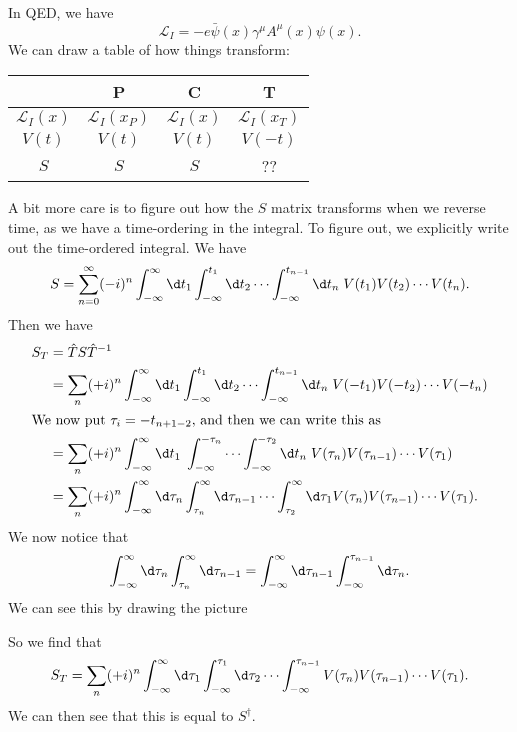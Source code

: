 \documentclass[a4paper]{article}
\begin{document}
\begin{eg}
  In QED, we have
  \[
    \mathcal{L}_I = - e \bar\psi (x) \gamma^\mu A^\mu (x) \psi(x).
  \]
  We can draw a table of how things transform:
  \begin{center}
    \begin{tabular}{cccc}
      \toprule
      & P & C & T\\
      \midrule
      $\mathcal{L}_I(x)$ & $\mathcal{L}_I(x_P)$ & $\mathcal{L}_I(x)$ & $\mathcal{L}_I(x_T)$\\
      $V(t)$ & $V(t)$ & $ V(t)$ & $V(-t)$ \\
      $S$ & $S$ & $S$ & ??\\
      \bottomrule
    \end{tabular}
  \end{center}
  A bit more care is to figure out how the $S$ matrix transforms when we reverse time, as we have a time-ordering in the integral. To figure out, we explicitly write out the time-ordered integral. We have
  \[
    S = \sum_{n = 0}^\infty (-i)^n \int_{-\infty}^\infty \d t_1 \int_{-\infty}^{t_1} \d t_2 \cdots \int_{-\infty}^{t_{n - 1}} \d t_n\; V(t_1) V(t_2) \cdots V(t_n).
  \]
  Then we have
  \begin{align*}
    S_T &= \hat{T} S\hat{T}^{-1} \\
    &= \sum_n (+i)^n \int_{-\infty}^\infty \d t_1 \int_{-\infty}^{t_1} \d t_2 \cdots \int_{-\infty}^{t_{n - 1}} \d t_n\; V(-t_1) V(-t_2) \cdots V(-t_n)\\
    \intertext{We now put $\tau_i = -t_{n + 1 - 2}$, and then we can write this as}
    &= \sum_n (+i)^n \int_{-\infty}^\infty \d t_1 \; \int_{-\infty}^{-\tau_n} \cdots \int_{-\infty}^{-\tau_2} \d t_n\; V(\tau_n) V(\tau_{n - 1}) \cdots V(\tau_1)\\
    &= \sum_n (+i)^n \int_{-\infty}^\infty \d \tau_n \int_{\tau_n}^\infty \d \tau_{n - 1} \cdots \int_{\tau_2}^\infty \d \tau_1 V(\tau_n) V(\tau_{n - 1}) \cdots V(\tau_1).
  \end{align*}
  We now notice that
  \[
    \int_{-\infty}^\infty \d \tau_n \int_{\tau_n}^\infty \d \tau_{n - 1} = \int_{-\infty}^\infty \d \tau_{n - 1} \int_{-\infty}^{\tau_{n - 1}} \d \tau_n.
  \]
  We can see this by drawing the picture
  \begin{center}
  \end{center}
  So we find that
  \[
    S_T = \sum_n (+i)^n \int_{-\infty}^\infty \d \tau_1 \int_{-\infty}^{\tau_1} \d \tau_2 \cdots \int_{-\infty}^{\tau_{n - 1}} V(\tau_n) V(\tau_{n - 1}) \cdots V(\tau_1).
  \]
  We can then see that this is equal to $S^\dagger$.


\end{eg}
\end{document}
